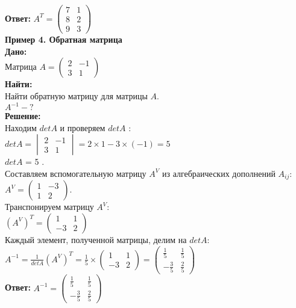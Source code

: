 \documentclass[a4paper,12pt]{article} %
\begin{document}
\textbf{Ответ:} $A^T =\begin{pmatrix} 
7&1\\
8&2\\
9&3\end{pmatrix}$\\[2cm]
\large \textbf{Пример 4. Обратная матрица}\\
\normalsize \textbf{Дано:}\\
Матрица $A=\begin{pmatrix} 
2&-1\\
3&1\end{pmatrix}$\\
\textbf{Найти:}\\
Найти обратную матрицу для матрицы $A$.\\
$A^{-1} - ?$\\
\textbf{Решение:}\\
Находим $det A$  и проверяем $det A$ :\\
$detA=\begin{vmatrix} 
2&-1\\
3&1\end{vmatrix}=2 \times 1-3 \times (-1)=5$\\
$det A$ = 5 .\\
Составляем вспомогательную матрицу $A^V$ из алгебраических дополнений $A_{ij}$: $A^V=\begin{pmatrix} 
1&-3\\
1&2\end{pmatrix}$.\\
Транспонируем матрицу $A^V$:\\
$(A^V)^T=\begin{pmatrix} 
1&1\\
-3&2\end{pmatrix}$\\
Каждый элемент, полученной матрицы, делим на $det A$:\\
$A^{-1}=\frac{1}{detA}(A^V)^T=\frac{1}{5} \times \begin{pmatrix} 
1&1\\
-3&2\end{pmatrix}=\begin{pmatrix} 
\frac{1}{5}&\frac{1}{5}\\
-\frac{3}{5}&\frac{2}{5}\end{pmatrix}$\\
\textbf{Ответ:} $A^{-1}=\begin{pmatrix} 
\frac{1}{5}&\frac{1}{5}\\
-\frac{3}{5}&\frac{2}{5}\end{pmatrix}$\\
\end{document}
